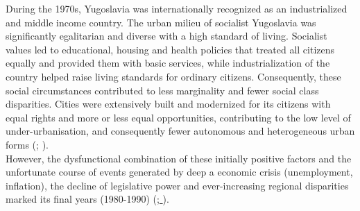 \documentclass[11pt]{report}
\begin{document}
During the 1970s, Yugoslavia was internationally recognized as an industrialized and middle income country. The urban milieu of socialist Yugoslavia was significantly egalitarian and diverse with a high standard of living. Socialist values led to educational, housing and health policies that treated all citizens equally and provided them with basic services, while industrialization of the country helped raise living standards for ordinary citizens. Consequently, these social circumstances contributed to less marginality and fewer social class disparities. Cities were extensively built and modernized for its citizens with equal rights and more or less equal opportunities, contributing to the low level of under-urbanisation, and consequently fewer autonomous and heterogeneous urban forms (\href{Vujovic}{\citealt{vujovic_belgrades_2007}}; \href{Stanek}{\citealt{stanek_urban_2014}}).
\\

However, the dysfunctional combination of these initially positive factors and the unfortunate course of events generated by deep a economic crisis (unemployment, inflation), the decline of legislative power and ever-increasing regional disparities marked its final years (1980-1990)  (\href{Estrin}{\citealt{estrin_yugoslavia:_1991}};\href{Stamolieva}{ \citealt{stambolieva_welfare_2013}}).
\\
\end{document}
